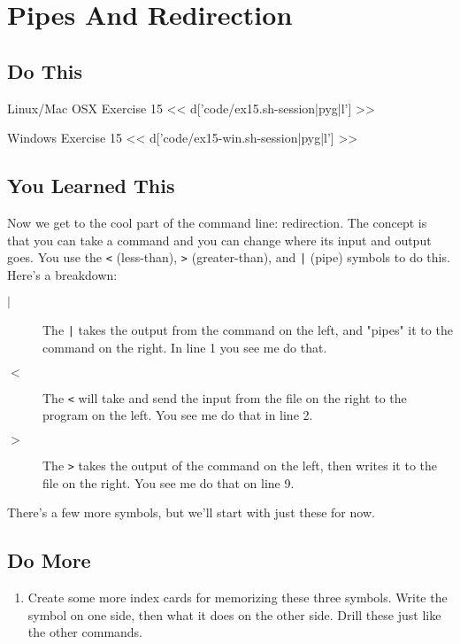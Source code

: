 \chapter{Pipes And Redirection}

\section{Do This}

\begin{code}{Linux/Mac OSX Exercise 15}
<< d['code/ex15.sh-session|pyg|l'] >>
\end{code}

\begin{code}{Windows Exercise 15}
<< d['code/ex15-win.sh-session|pyg|l'] >>
\end{code}

\section{You Learned This}

Now we get to the cool part of the command line: redirection.  The concept is
that you can take a command and you can change where its input and output goes. 
You use the \verb|<| (less-than), \verb|>| (greater-than), and \verb,|, (pipe) 
symbols to do this.  Here's a breakdown:

\begin{description}
\item[$|$] The \verb,|, takes the output from the command on the left, and "pipes" it to the command on the right.  In line 1 you see me do that.
\item[$<$] The \verb|<| will take and send the input from the file on the right to the program on the left.  You see me do that in line 2.
\item[$>$] The \verb|>| takes the output of the command on the left, then writes it
    to the file on the right.  You see me do that on line 9.
\end{description}

There's a few more symbols, but we'll start with just these for now.

\section{Do More}

\begin{enumerate}
\item Create some more index cards for memorizing these three symbols.  Write the symbol on one side, then what it does on the other side.  Drill these just like the other commands.
\end{enumerate}

